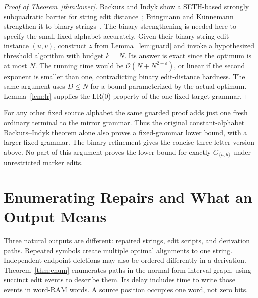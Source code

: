 \documentclass[sigconf,screen]{acmart}
\newcommand{\eps}{\varepsilon}
\newcommand{\Oh}{\mathcal O}
\theoremstyle{definition}
\begin{document}
\begin{proof}[Proof of Theorem~\ref{thm:lower}]
Backurs and Indyk show a SETH-based strongly subquadratic barrier for string edit distance~\cite{backurs2015}; Bringmann and K\"unnemann strengthen it to binary strings~\cite{bringmann2015}. The binary strengthening is needed here to specify the small fixed alphabet accurately. Given their binary string-edit instance $(u,v)$, construct $z$ from Lemma~\ref{lem:guard} and invoke a hypothesized threshold algorithm with budget $k=N$. Its answer is exact since the optimum is at most $N$. The running time would be $\Oh(N+N^{2-\eps})$, or linear if the second exponent is smaller than one, contradicting binary edit-distance hardness. The same argument uses $D\le N$ for a bound parameterized by the actual optimum. Lemma~\ref{lem:lr} supplies the LR(0) property of the one fixed target grammar.
\end{proof}

For any other fixed source alphabet the same guarded proof adds just one fresh ordinary terminal to the mirror grammar. Thus the original constant-alphabet Backurs--Indyk theorem alone also proves a fixed-grammar lower bound, with a larger fixed grammar. The binary refinement gives the concise three-letter version above. No part of this argument proves the lower bound for exactly $G_{\{a,b\}}$ under unrestricted marker edits.

\section{Enumerating Repairs and What an Output Means}\label{sec:enum}
Three natural outputs are different: repaired strings, edit scripts, and derivation paths. Repeated symbols create multiple optimal alignments to one string. Independent endpoint deletions may also be ordered differently in a derivation. Theorem~\ref{thm:enum} enumerates paths in the normal-form interval graph, using succinct edit events to describe them. Its delay includes time to write those events in word-RAM words. A source position occupies one word, not zero bits.
\end{document}
